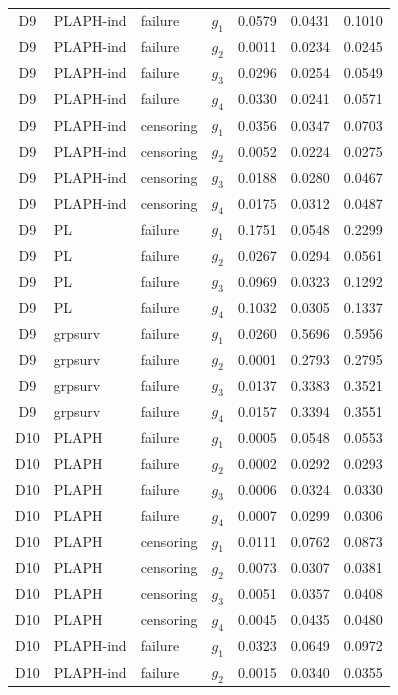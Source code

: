\begin{longtable}{clllrrr}
D9 & PLAPH-ind & failure & $g_{1}$ & 0.0579 & 0.0431 & 0.1010 \\
D9 & PLAPH-ind & failure & $g_{2}$ & 0.0011 & 0.0234 & 0.0245 \\
D9 & PLAPH-ind & failure & $g_{3}$ & 0.0296 & 0.0254 & 0.0549 \\
D9 & PLAPH-ind & failure & $g_{4}$ & 0.0330 & 0.0241 & 0.0571 \\
D9 & PLAPH-ind & censoring & $g_{1}$ & 0.0356 & 0.0347 & 0.0703 \\
D9 & PLAPH-ind & censoring & $g_{2}$ & 0.0052 & 0.0224 & 0.0275 \\
D9 & PLAPH-ind & censoring & $g_{3}$ & 0.0188 & 0.0280 & 0.0467 \\
D9 & PLAPH-ind & censoring & $g_{4}$ & 0.0175 & 0.0312 & 0.0487 \\
D9 & PL & failure & $g_{1}$ & 0.1751 & 0.0548 & 0.2299 \\
D9 & PL & failure & $g_{2}$ & 0.0267 & 0.0294 & 0.0561 \\
D9 & PL & failure & $g_{3}$ & 0.0969 & 0.0323 & 0.1292 \\
D9 & PL & failure & $g_{4}$ & 0.1032 & 0.0305 & 0.1337 \\
D9 & grpsurv & failure & $g_{1}$ & 0.0260 & 0.5696 & 0.5956 \\
D9 & grpsurv & failure & $g_{2}$ & 0.0001 & 0.2793 & 0.2795 \\
D9 & grpsurv & failure & $g_{3}$ & 0.0137 & 0.3383 & 0.3521 \\
D9 & grpsurv & failure & $g_{4}$ & 0.0157 & 0.3394 & 0.3551 \\
D10 & PLAPH & failure & $g_{1}$ & 0.0005 & 0.0548 & 0.0553 \\
D10 & PLAPH & failure & $g_{2}$ & 0.0002 & 0.0292 & 0.0293 \\
D10 & PLAPH & failure & $g_{3}$ & 0.0006 & 0.0324 & 0.0330 \\
D10 & PLAPH & failure & $g_{4}$ & 0.0007 & 0.0299 & 0.0306 \\
D10 & PLAPH & censoring & $g_{1}$ & 0.0111 & 0.0762 & 0.0873 \\
D10 & PLAPH & censoring & $g_{2}$ & 0.0073 & 0.0307 & 0.0381 \\
D10 & PLAPH & censoring & $g_{3}$ & 0.0051 & 0.0357 & 0.0408 \\
D10 & PLAPH & censoring & $g_{4}$ & 0.0045 & 0.0435 & 0.0480 \\
D10 & PLAPH-ind & failure & $g_{1}$ & 0.0323 & 0.0649 & 0.0972 \\
D10 & PLAPH-ind & failure & $g_{2}$ & 0.0015 & 0.0340 & 0.0355 \\

\end{longtable}
